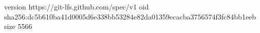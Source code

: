 version https://git-lfs.github.com/spec/v1
oid sha256:dc5b610ba41d0005d6e338bb53284e82da01359ecacba3756574f3fc84bb1eeb
size 5566
